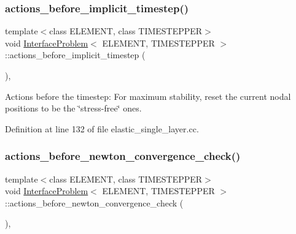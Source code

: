 \subsubsection{\texorpdfstring{actions\+\_\+before\+\_\+implicit\+\_\+timestep()}{actions\_before\_implicit\_timestep()}}
{\footnotesize\ttfamily template$<$class E\+L\+E\+M\+E\+NT, class T\+I\+M\+E\+S\+T\+E\+P\+P\+ER$>$ \\
void \hyperlink{classInterfaceProblem}{Interface\+Problem}$<$ E\+L\+E\+M\+E\+NT, T\+I\+M\+E\+S\+T\+E\+P\+P\+ER $>$\+::actions\+\_\+before\+\_\+implicit\+\_\+timestep (\begin{DoxyParamCaption}{ }\end{DoxyParamCaption})\hspace{0.3cm}{\ttfamily [inline]}, {\ttfamily [private]}}



Actions before the timestep\+: For maximum stability, reset the current nodal positions to be the \char`\"{}stress-\/free\char`\"{} ones. 



Definition at line 132 of file elastic\+\_\+single\+\_\+layer.\+cc.

\mbox{\label{classInterfaceProblem_ab4193771472aefce4cd67261491cc344}} 
\subsubsection{\texorpdfstring{actions\+\_\+before\+\_\+newton\+\_\+convergence\+\_\+check()}{actions\_before\_newton\_convergence\_check()}}
{\footnotesize\ttfamily template$<$class E\+L\+E\+M\+E\+NT, class T\+I\+M\+E\+S\+T\+E\+P\+P\+ER$>$ \\
void \hyperlink{classInterfaceProblem}{Interface\+Problem}$<$ E\+L\+E\+M\+E\+NT, T\+I\+M\+E\+S\+T\+E\+P\+P\+ER $>$\+::actions\+\_\+before\+\_\+newton\+\_\+convergence\+\_\+check (\begin{DoxyParamCaption}{ }\end{DoxyParamCaption})\hspace{0.3cm}{\ttfamily [inline]}, {\ttfamily [private]}}



